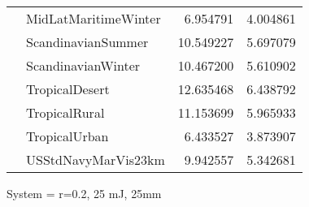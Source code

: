 \begin{tabular}{llrr}
             & MidLatMaritimeWinter &   6.954791 &  4.004861 \\
             & ScandinavianSummer &  10.549227 &  5.697079 \\
             & ScandinavianWinter &  10.467200 &  5.610902 \\
             & TropicalDesert &  12.635468 &  6.438792 \\
             & TropicalRural &  11.153699 &  5.965933 \\
             & TropicalUrban &   6.433527 &  3.873907 \\
             & USStdNavyMarVis23km &   9.942557 &  5.342681 \\
\bottomrule
\end{tabular}


\clearpage
System = r=0.2, 25 mJ, 25mm

